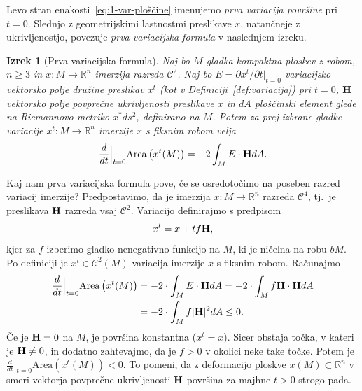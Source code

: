\documentclass[12pt,a4paper,twoside]{article}
\theoremstyle{definition} %
\theoremstyle{plain} %
\newtheorem{izrek}[definicija]{Izrek}
\numberwithin{equation}{section}  %
\newcommand{\R}{\mathbb R}
\begin{document}
Levo stran enakosti~\eqref{eq:1-var-ploščine} imenujemo \emph{prva variacija površine} pri $t=0$. Slednjo z geometrijskimi lastnostmi preslikave $x$, natančneje z ukrivljenostjo, povezuje \emph{prva variacijska formula} v naslednjem izreku. 

\begin{izrek}[Prva variacijska formula] \label{izr:1-var-formula}
Naj bo $M$ gladka kompaktna ploskev z robom, $n \geq 3$ in $x \colon M \to \R^{n}$ imerzija razreda $\mathcal{C}^2$. Naj bo $E = \partial{x^{t}} / \partial{t}|_{t=0}$ variacijsko vektorsko polje družine preslikav $x^{t}$ (kot v Definiciji~\ref{def:variacija}) pri $t=0$, $\textbf{\textup{H}}$ vektorsko polje povprečne ukrivljenosti preslikave $x$ in $dA$ ploščinski element glede na Riemannovo metriko $x^{*}ds^2$, definirano na $M$.
Potem za prej izbrane gladke variacije $x^{t} \colon M \to \R^{n}$ imerzije $x$ s fiksnim robom velja
\begin{equation} \label{eq:1-var-formula}
\frac{d}{dt} \Big|_{t=0} \mathrm{Area} \left(x^{t}(M)\right) = -2 \int_{M} {E \cdot \textbf{\textup{H}} dA}.
\end{equation}
\end{izrek}

Kaj nam prva variacijska formula pove, če se osredotočimo na poseben razred variacij imerzije? Predpostavimo, da je imerzija $x \colon M \to \R^{n}$ razreda $\mathcal{C}^4$, tj.~je preslikava $\textbf{\textup{H}}$ razreda vsaj $\mathcal{C}^2$. Variacijo definirajmo s predpisom
\begin{equation}
x^{t} = x + tf\textbf{\textup{H}},
\end{equation}
kjer za $f$ izberimo gladko nenegativno funkcijo na $M$, ki je ničelna na robu $bM$. Po definiciji je $x^{t} \in \mathcal{C}^2(M)$ variacija imerzije $x$ s fiksnim robom. Računajmo
\begin{align*}
\frac{d}{dt} \Big|_{t=0} \text{Area} \left(x^{t}(M)\right) &= -2 \cdot \int_{M} E \cdot \textbf{\textup{H}} dA = -2 \cdot \int_{M} f \textbf{\textup{H}} \cdot \textbf{\textup{H}} dA \\
&= -2 \cdot \int_{M} f |\textbf{\textup{H}}|^2 dA \leq 0.
\end{align*} 
Če je $\textbf{\textup{H}} = 0$ na $M$, je površina konstantna ($x^{t}=x$).
Sicer obstaja točka, v kateri je $\textbf{\textup{H}} \neq 0$, in dodatno zahtevajmo, da je $f>0$ v okolici neke take točke. Potem je $\frac{d}{dt} \Big|_{t=0} \text{Area}(x^{t}(M)) < 0$.
To pomeni, da z deformacijo ploskve $x(M) \subset \mathbb{R}^{n}$ v smeri vektorja povprečne ukrivljenosti $\textbf{\textup{H}}$ površina za majhne $t>0$ strogo pada.
\end{document}
